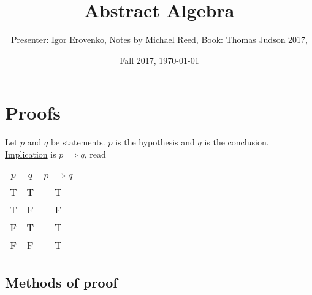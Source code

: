 \documentclass[]{article}
\author{Presenter: Igor Erovenko, Notes by Michael Reed, Book: Thomas Judson 2017,}
\title{Abstract Algebra}
\date{Fall 2017, \today}
\begin{document}
\maketitle


\section{Proofs}

Let $p$ and $q$ be statements.  $p$ is the hypothesis and $q$ is the conclusion. \ul{Implication} is $p\implies q$, read 
\begin{center}
\begin{tabular}{|c|c|c|}
	\hline 
	$p$ & $q$ & $p\implies q$ \\ 
	\hline 
	T & T & T \\ 
	\hline 
	T & F & F \\ 
	\hline 
	F & T & T \\ 
	\hline 
	F & F & T \\ 
	\hline 
\end{tabular}
\end{center}

\subsection*{Methods of proof}
\end{document}
